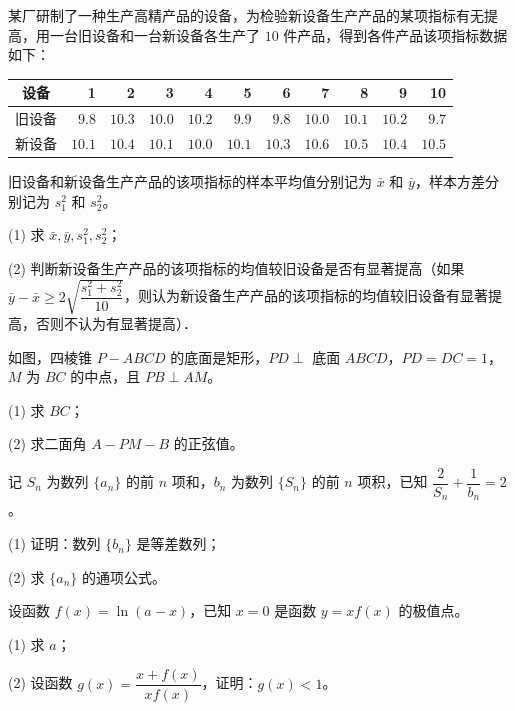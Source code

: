 \begin{question}
某厂研制了一种生产高精产品的设备，为检验新设备生产产品的某项指标有无提高，用一台旧设备和一台新设备各生产了 $10$ 件产品，得到各件产品该项指标数据如下：

\begin{center}
\begingroup\setlength{\tabcolsep}{4pt}
\begin{tabular}{crrrrrrrrrr}
\toprule
设备 & 1 & 2 & 3 & 4 & 5 & 6 & 7 & 8 & 9 & 10 \\
\midrule
旧设备 & $9.8$ & $10.3$ & $10.0$ & $10.2$ & $9.9$ & $9.8$ & $10.0$ & $10.1$ & $10.2$ & $9.7$ \\
新设备 & $10.1$ & $10.4$ & $10.1$ & $10.0$ & $10.1$ & $10.3$ & $10.6$ & $10.5$ & $10.4$ & $10.5$ \\
\bottomrule
\end{tabular}
\endgroup
\end{center}

旧设备和新设备生产产品的该项指标的样本平均值分别记为 $\bar x$ 和 $\bar y$，样本方差分别记为 $s_1^2$ 和 $s_2^2$。

  (1) 求 $\bar x,\bar y,s_1^2,s_2^2$；

  (2) 判断新设备生产产品的该项指标的均值较旧设备是否有显著提高（如果 $\bar y-\bar x\geqslant2\sqrt{\dfrac{s_1^2+s_2^2}{10}}$，则认为新设备生产产品的该项指标的均值较旧设备有显著提高，否则不认为有显著提高）．

\Needspace{0.4\textheight}
\end{question}
\begin{question}
如图，四棱锥 $P-ABCD$ 的底面是矩形，$PD\perp$ 底面 $ABCD$，$PD=DC=1$，$M$ 为 $BC$ 的中点，且 $PB\perp AM$。
\nopagebreak[4]
\begin{center}\end{center}
\nopagebreak[4]
  (1) 求 $BC$；

  (2) 求二面角 $A-PM-B$ 的正弦值。

\end{question}
\begin{question}
记 $S_n$ 为数列 $\{a_n\}$ 的前 $n$ 项和，$b_n$ 为数列 $\{S_n\}$ 的前 $n$ 项积，已知 $\dfrac2{S_n}+\dfrac1{b_n}=2$。

  (1) 证明：数列 $\{b_n\}$ 是等差数列；

  (2) 求 $\{a_n\}$ 的通项公式。

\end{question}
\begin{question}
设函数 $f(x)=\ln(a-x)$，已知 $x=0$ 是函数 $y=xf(x)$ 的极值点。

  (1) 求 $a$；

  (2) 设函数 $g(x)=\dfrac{x+f(x)}{xf(x)}$，证明：$g(x)<1$。

\end{question}
